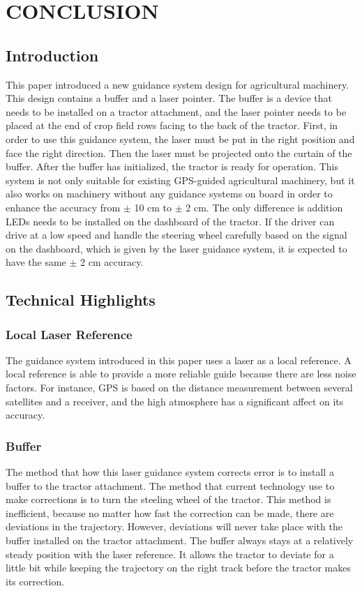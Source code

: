 \chapter{CONCLUSION}

\section{Introduction}
This paper introduced a new guidance system design for agricultural machinery. This design contains a buffer and a laser pointer. The buffer is a device that needs to be installed on a tractor attachment, and the laser pointer needs to be placed at the end of crop field rows facing to the back of the tractor. First, in order to use this guidance system, the laser must be put in the right position and face the right direction. Then the laser must be projected onto the curtain of the buffer. After the buffer has initialized, the tractor is ready for operation. This system is not only suitable for existing GPS-guided agricultural machinery, but it also works on machinery without any guidance systems on board in order to enhance the accuracy from $\pm$ 10 cm to $\pm$ 2 cm. The only difference is addition LEDs needs to be installed on the dashboard of the tractor. If the driver can drive at a low speed and handle the steering wheel carefully based on the signal on the dashboard, which is given by the laser guidance system, it is expected to have the same $\pm$ 2 cm accuracy. 


\section{Technical Highlights}

\subsection{Local Laser Reference}
The guidance system introduced in this paper uses a laser as a local reference. A local reference is able to provide a more reliable guide because there are less noise factors. For instance, GPS is based on the distance measurement between several satellites and a receiver, and the high atmosphere has a significant affect on its accuracy. 

\subsection{Buffer}
The method that how this laser guidance system corrects error is to install a buffer to the tractor attachment. The method that current technology use to make corrections is to turn the steeling wheel of the tractor. This method is inefficient, because no matter how fast the correction can be made, there are deviations in the trajectory. However, deviations will never take place with the buffer installed on the tractor attachment. The buffer always stays at a relatively steady position with the laser reference. It allows the tractor to deviate for a little bit while keeping the trajectory on the right track before the tractor makes its correction.

